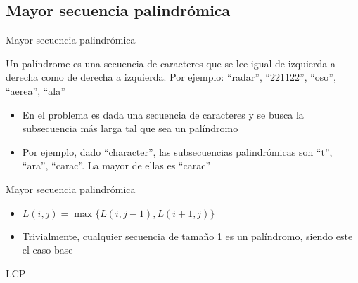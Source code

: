 \documentclass[]{beamer}
\begin{document}
\subsection{Mayor secuencia palindr\'omica}
\begin{frame}{Mayor secuencia palindr\'omica}
  \begin{definition}
    Un pal\'indrome es una secuencia de caracteres que se lee igual de izquierda a derecha como de derecha a izquierda.
    Por ejemplo: ``radar'', ``221122'', ``oso'', ``aerea'', ``ala''
  \end{definition}
  \begin{itemize}
    \item En el problema es dada una secuencia de caracteres y se busca la subsecuencia m\'as larga tal que sea un pal\'indromo
      \pause
    \item Por ejemplo, dado ``character'', las subsecuencias palindr\'omicas son ``t'', ``ara'', ``carac''. La mayor de ellas es ``carac''
  \end{itemize}
\end{frame}

\begin{frame}{Mayor secuencia palindr\'omica}
  \pause
  \begin{itemize}
    \item $L(i,j) = \max \{L(i,j-1), L(i+1,j)\}$
      \pause
    \item Trivialmente, cualquier secuencia de tama\~no 1 es un pal\'indromo, siendo este el caso base
  \end{itemize}
\end{frame}

\begin{frame}{LCP}
  \begin{algorithm}[H]
    \BlankLine
    {
    }
    {
    } 
  \end{algorithm}
\end{frame}
\end{document}
